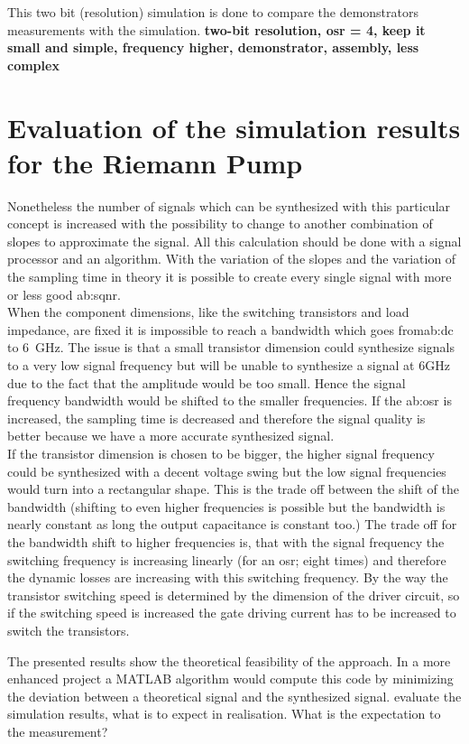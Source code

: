 This two bit (resolution) simulation is done to compare the demonstrators measurements with the simulation. \textbf{two-bit resolution, osr = 4, keep it small and simple, frequency higher, demonstrator, assembly, less complex} 


\section{Evaluation of the simulation results for the Riemann Pump}
Nonetheless the number of signals which can be synthesized with this particular concept is increased with the possibility to change to another combination of slopes to approximate the signal.
All this calculation should be done with a signal processor and an algorithm.
With the variation of the slopes and the variation of the sampling time in theory it is possible to create every single signal with more or less good \gls{ab:sqnr}.
\\
When the component dimensions, like the switching transistors and load impedance, are fixed it is impossible to reach a bandwidth which goes from\gls{ab:dc} to \SI{6}{\GHz}.
The issue is that a small transistor dimension could synthesize signals to a very low signal frequency but will be unable to synthesize a signal at 6GHz due to the fact that the amplitude would be too small.
Hence the signal frequency bandwidth would be shifted to the smaller frequencies. 
If the \gls{ab:osr} is increased, the sampling time is decreased and therefore the signal quality is better because we have a more accurate synthesized signal. \\
If the transistor dimension is chosen to be bigger, the higher signal frequency could be synthesized with a decent voltage swing but the low signal frequencies would turn into a rectangular shape. 
This is the trade off between the shift of the bandwidth (shifting to even higher frequencies is possible but the bandwidth is nearly constant as long the output capacitance is constant too.) The trade off for the bandwidth shift to higher frequencies is, that with the signal frequency the switching frequency is increasing linearly (for an osr; eight times) and therefore the dynamic losses are increasing with this switching frequency.
By the way the transistor switching speed is determined by the dimension of the driver circuit, so if the switching speed is increased the gate driving current has to be increased to switch the transistors.

 The presented results show the theoretical feasibility of the approach.
 In a more enhanced project a MATLAB algorithm would compute this code by minimizing the deviation between a theoretical signal and the synthesized signal.
evaluate the simulation results, what is to expect in realisation. 
What is the expectation to the measurement?
